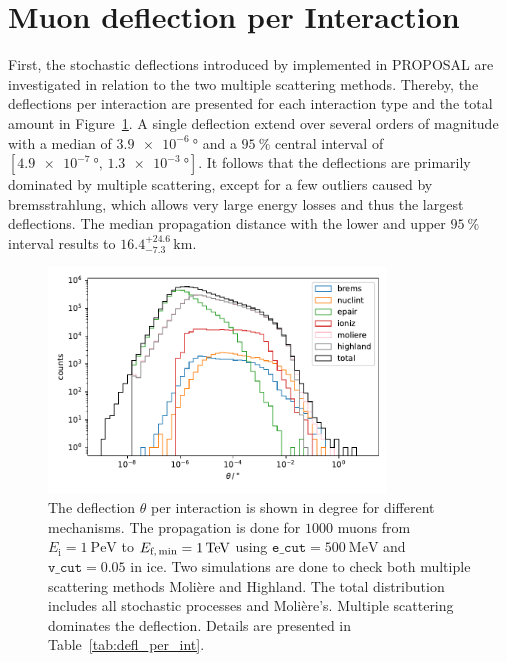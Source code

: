 \section{Muon deflection per Interaction}\label{sec:defl_per_int}
First, the stochastic deflections introduced by \cite{Van_Ginneken} implemented 
in PROPOSAL are investigated in relation to the two multiple scattering methods. Thereby, the deflections per interaction are presented 
for each interaction type and the total amount in Figure~\ref{fig:defl_per_int}. A single deflection 
extend over several orders of magnitude with a median of $\SI{3.9e-6}{\degree}$
and a $\SI{95}{\percent}$ central interval of $[\SI{4.9e-7}{\degree}, \,\SI{1.3e-3}{\degree}]$. 
It follows that the deflections are primarily dominated by multiple scattering, except for a few outliers caused by bremsstrahlung, which 
allows very large energy losses and thus the largest deflections.
The median propagation distance with the lower and upper $\SI{95}{\percent}$ 
interval results to $16.4_{-7.3}^{+24.6}\,\si{\kilo\meter}$.

\begin{figure}
    \centering 
    \includegraphics[width=0.8\textwidth]{figures/1PeV_1TeV_1000events_moliere_ecut500_vcut0.05_interpol200_vG_binning_paper.pdf}
    \caption{The deflection $\theta$ per interaction is shown in degree for different mechanisms. The propagation is done for $\num{1000}$ 
    muons from $E_{\text{i}} = \SI{1}{\peta\electronvolt}$ to $E_{\text{f,\,min}} = \SI{1}{\tera\electronvolt}$ using $\texttt{e\_cut} = \SI{500}{\mega\electronvolt}$ and $\texttt{v\_cut} = 0.05$ in ice. Two simulations 
    are done to check both multiple scattering methods Molière and Highland. The total distribution includes all stochastic processes and Molière's. Multiple scattering dominates the deflection. Details are presented in 
    Table~\ref{tab:defl_per_int}.}
    \label{fig:defl_per_int}
\end{figure}

